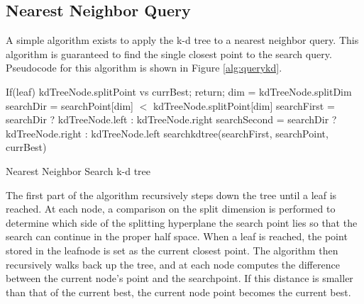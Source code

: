 \subsection{Nearest Neighbor Query}
\label{sec:kdquery}

A simple algorithm exists to apply the k-d tree to a nearest neighbor query.  This algorithm is guaranteed to find the single closest point to the search query.  Pseudocode for this algorithm is shown in Figure \ref{alg:querykd}.

\begin{algorithm}
\begin{algorithmic}
	\State If(leaf) kdTreeNode.splitPoint vs currBest; return;
	\State dim = kdTreeNode.splitDim
	\State searchDir = searchPoint[dim] $<$ kdTreeNode.splitPoint[dim]
	\State searchFirst = searchDir ? kdTreeNode.left : kdTreeNode.right
	\State searchSecond = searchDir ? kdTreeNode.right : kdTreeNode.left
	\State searchkdtree(searchFirst, searchPoint, currBest)
	\State

\EndFunction
\end{algorithmic}
\caption{Nearest Neighbor Search k-d tree}
\label{alg:querykd}
\end{algorithm}

The first part of the algorithm recursively steps down the tree until a leaf is reached.  At each node, a comparison on the split dimension is performed to determine which side of the splitting hyperplane the search point lies so that the search can continue in the proper half space.  When a leaf is reached, the point stored in the leafnode is set as the current closest point.  The algorithm then recursively walks back up the tree, and at each node computes the difference between the current node's point and the searchpoint.  If this distance is smaller than that of the current best, the current node point becomes the current best.

